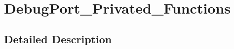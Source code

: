 \hypertarget{group___debug_port___privated___functions}{}\section{Debug\+Port\+\_\+\+Privated\+\_\+\+Functions}
\label{group___debug_port___privated___functions}


\subsection{Detailed Description}
